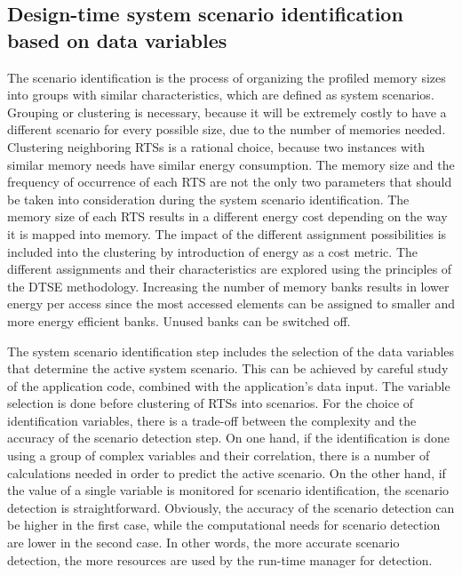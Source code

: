 \subsection{Design-time system scenario identification based on data variables}

The scenario identification is the process of organizing the profiled memory sizes into groups with similar characteristics, which are defined as system scenarios. 
Grouping or clustering is necessary, because it will be extremely costly to have a different scenario for every possible size, due to the number of memories needed. 
Clustering neighboring RTSs is a rational choice, because two instances with similar memory needs have similar energy consumption. 
The memory size and the frequency of occurrence of each RTS are not the only two parameters that should be taken into consideration during the system scenario identification. 
The memory size of each RTS results in a different energy cost depending on the way it is mapped into memory. 
The impact of the different assignment possibilities is included into the clustering by introduction of energy as a cost metric. 
The different assignments and their characteristics are explored using the principles of the DTSE methodology.
Increasing the number of memory banks results in lower energy per access since the most accessed elements can be assigned to smaller and more energy efficient banks. 
Unused banks can be switched off.

The system scenario identification step includes the selection of the data variables that determine the active system scenario. 
This can be achieved by careful study of the application code, combined with the application's data input.
The variable selection is done before clustering of RTSs into scenarios.
For the choice of identification variables, there is a trade-off between the complexity and the accuracy of the scenario detection step.
On one hand, if the identification is done using a group of complex variables and their correlation, there is a number of calculations needed in order to predict the active scenario. 
On the other hand, if the value of a single variable is monitored for scenario identification, the scenario detection is straightforward.
Obviously, the accuracy of the scenario detection can be higher in the first case, while the computational needs for scenario detection are lower in the second case.
In other words, the more accurate scenario detection, the more resources are used by the run-time manager for detection.

